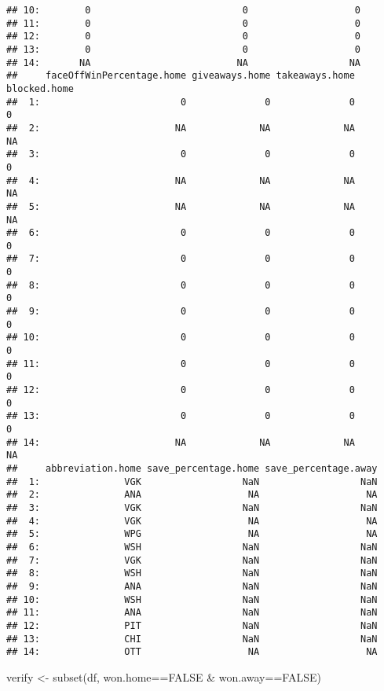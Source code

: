 \documentclass[
]{article}
\newenvironment{Shaded}{\begin{snugshade}}{\end{snugshade}}
\newcommand{\ConstantTok}[1]{\textcolor[rgb]{0.00,0.00,0.00}{#1}}
\newcommand{\FunctionTok}[1]{\textcolor[rgb]{0.00,0.00,0.00}{#1}}
\newcommand{\NormalTok}[1]{#1}
\newcommand{\OtherTok}[1]{\textcolor[rgb]{0.56,0.35,0.01}{#1}}
\newcommand{\SpecialCharTok}[1]{\textcolor[rgb]{0.00,0.00,0.00}{#1}}
\begin{document}
\begin{verbatim}
## 10:        0                           0                   0
## 11:        0                           0                   0
## 12:        0                           0                   0
## 13:        0                           0                   0
## 14:       NA                          NA                  NA
##     faceOffWinPercentage.home giveaways.home takeaways.home blocked.home
##  1:                         0              0              0            0
##  2:                        NA             NA             NA           NA
##  3:                         0              0              0            0
##  4:                        NA             NA             NA           NA
##  5:                        NA             NA             NA           NA
##  6:                         0              0              0            0
##  7:                         0              0              0            0
##  8:                         0              0              0            0
##  9:                         0              0              0            0
## 10:                         0              0              0            0
## 11:                         0              0              0            0
## 12:                         0              0              0            0
## 13:                         0              0              0            0
## 14:                        NA             NA             NA           NA
##     abbreviation.home save_percentage.home save_percentage.away
##  1:               VGK                  NaN                  NaN
##  2:               ANA                   NA                   NA
##  3:               VGK                  NaN                  NaN
##  4:               VGK                   NA                   NA
##  5:               WPG                   NA                   NA
##  6:               WSH                  NaN                  NaN
##  7:               VGK                  NaN                  NaN
##  8:               WSH                  NaN                  NaN
##  9:               ANA                  NaN                  NaN
## 10:               WSH                  NaN                  NaN
## 11:               ANA                  NaN                  NaN
## 12:               PIT                  NaN                  NaN
## 13:               CHI                  NaN                  NaN
## 14:               OTT                   NA                   NA
\end{verbatim}

\begin{Shaded}
\begin{Highlighting}[]
\NormalTok{verify }\OtherTok{\textless{}{-}} \FunctionTok{subset}\NormalTok{(df, won.home}\SpecialCharTok{==}\ConstantTok{FALSE} \SpecialCharTok{\&}\NormalTok{ won.away}\SpecialCharTok{==}\ConstantTok{FALSE}\NormalTok{)}
\end{Highlighting}
\end{Shaded}
\end{document}
